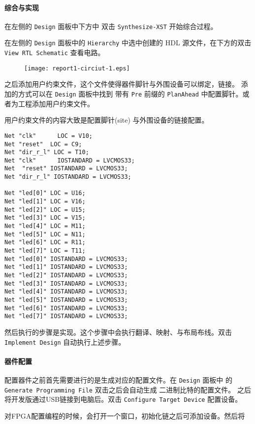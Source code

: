 \documentclass{ctexart}
\begin{document}
        \paragraph{综合与实现}

		在左侧的 \verb|Design| 面板中下方中 双击 \verb|Synthesize-XST| 开始综合过程。
		

        在左侧的 \verb|Design| 面板中的 \verb|Hierarchy| 中选中创建的 HDL 源文件，在下方的双击 \verb|View RTL Schematic| 查看电路。

        \begin{figure}
\centering
\texttt{[image: report1-circiut-1.eps]}
\caption[Circuit]{}
\label{fig:report1-circiut-1}
\end{figure}

        之后添加用户约束文件，这个文件使得器件脚针与外围设备可以绑定，链接。
        添加的方式可以在 \verb|Design| 面板中找到 带有 \verb|Pre| 前缀的 \verb|PlanAhead| 中配置脚针。或者为工程添加用户约束文件。
		
        用户约束文件的内容大致是配置脚针(site) 与外围设备的链接配置。
\begin{lstlisting}
Net "clk"      LOC = V10;
Net "reset"  LOC = C9;
Net "dir_r_l" LOC = T10;
Net "clk"      IOSTANDARD = LVCMOS33;
Net  "reset" IOSTANDARD = LVCMOS33;
Net "dir_r_l" IOSTANDARD = LVCMOS33;

Net "led[0]" LOC = U16;
Net "led[1]" LOC = V16;
Net "led[2]" LOC = U15;
Net "led[3]" LOC = V15;
Net "led[4]" LOC = M11;
Net "led[5]" LOC = N11;
Net "led[6]" LOC = R11;
Net "led[7]" LOC = T11;
Net "led[0]" IOSTANDARD = LVCMOS33;
Net "led[1]" IOSTANDARD = LVCMOS33;
Net "led[2]" IOSTANDARD = LVCMOS33;
Net "led[3]" IOSTANDARD = LVCMOS33;
Net "led[4]" IOSTANDARD = LVCMOS33;
Net "led[5]" IOSTANDARD = LVCMOS33;
Net "led[6]" IOSTANDARD = LVCMOS33;
Net "led[7]" IOSTANDARD = LVCMOS33;
\end{lstlisting}
		
        然后执行的步骤是实现。这个步骤中会执行翻译、映射、与布局布线。双击
        \verb|Implement Design| 自动执行上述步骤。
		
        \paragraph{器件配置}

        配置器件之前首先需要进行的是生成对应的配置文件。在 \verb|Design| 面板中
        的 \verb|Generate Programming File|  双击之后会自动生成 二进制比特的配置文件。
        之后将开发版通过USB链接到电脑后。双击 \verb|Configure Target Device| 配置设备。

        对FPGA配置编程的时候，会打开一个窗口，初始化链之后可添加设备。然后将
\end{document}

